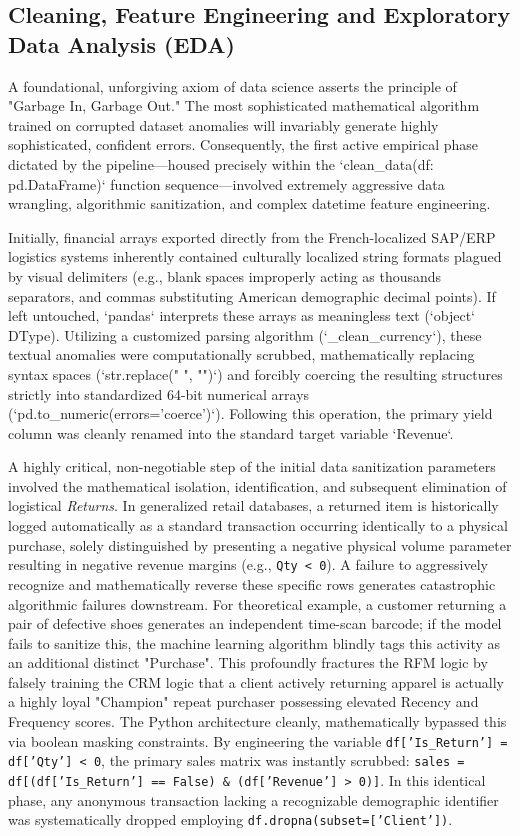 \documentclass[12pt,a4paper]{report}
\begin{document}
\subsection{Cleaning, Feature Engineering and Exploratory Data Analysis (EDA)}
A foundational, unforgiving axiom of data science asserts the principle of "Garbage In, Garbage Out." The most sophisticated mathematical algorithm trained on corrupted dataset anomalies will invariably generate highly sophisticated, confident errors. Consequently, the first active empirical phase dictated by the pipeline—housed precisely within the `clean_data(df: pd.DataFrame)` function sequence—involved extremely aggressive data wrangling, algorithmic sanitization, and complex datetime feature engineering.

Initially, financial arrays exported directly from the French-localized SAP/ERP logistics systems inherently contained culturally localized string formats plagued by visual delimiters (e.g., blank spaces improperly acting as thousands separators, and commas substituting American demographic decimal points). If left untouched, `pandas` interprets these arrays as meaningless text (`object` DType). Utilizing a customized parsing algorithm (`_clean_currency`), these textual anomalies were computationally scrubbed, mathematically replacing syntax spaces (`str.replace(" ", "")`) and forcibly coercing the resulting structures strictly into standardized 64-bit numerical arrays (`pd.to_numeric(errors='coerce')`). Following this operation, the primary yield column was cleanly renamed into the standard target variable `Revenue`.

A highly critical, non-negotiable step of the initial data sanitization parameters involved the mathematical isolation, identification, and subsequent elimination of logistical \textit{Returns}. In generalized retail databases, a returned item is historically logged automatically as a standard transaction occurring identically to a physical purchase, solely distinguished by presenting a negative physical volume parameter resulting in negative revenue margins (e.g., \texttt{Qty < 0}). A failure to aggressively recognize and mathematically reverse these specific rows generates catastrophic algorithmic failures downstream. For theoretical example, a customer returning a pair of defective shoes generates an independent time-scan barcode; if the model fails to sanitize this, the machine learning algorithm blindly tags this activity as an additional distinct "Purchase". This profoundly fractures the RFM logic by falsely training the CRM logic that a client actively returning apparel is actually a highly loyal "Champion" repeat purchaser possessing elevated Recency and Frequency scores. The Python architecture cleanly, mathematically bypassed this via boolean masking constraints. By engineering the variable \texttt{df['Is\_Return'] = df['Qty'] < 0}, the primary sales matrix was instantly scrubbed: \texttt{sales = df[(df['Is\_Return'] == False) \& (df['Revenue'] > 0)]}. In this identical phase, any anonymous transaction lacking a recognizable demographic identifier was systematically dropped employing \texttt{df.dropna(subset=['Client'])}.
\end{document}
